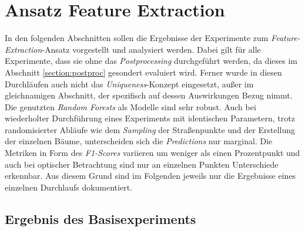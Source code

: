 \section{Ansatz Feature Extraction} 

In den folgenden Abschnitten sollen die Ergebnisse der Experimente zum \textit{Feature-Extraction}-Ansatz vorgestellt und analysiert werden. Dabei gilt für alle Experimente, dass sie ohne das \textit{Postprocessing} durchgeführt werden, da dieses im Abschnitt \ref{section:postproc} gesondert evaluiert wird. Ferner wurde in diesen Durchläufen auch nicht das \textit{Uniqueness}-Konzept eingesetzt, außer im gleichnamigen Abschnitt, der spezifisch auf dessen Auswirkungen Bezug nimmt.
Die genutzten \textit{Random Forests} als Modelle sind sehr robust. Auch bei wiederholter Durchführung eines Experiments mit identischen Parametern, trotz randomisierter Abläufe wie dem \textit{Sampling} der Straßenpunkte und der Erstellung der einzelnen Bäume, unterscheiden sich die \textit{Predictions} nur marginal. Die Metriken in Form des \textit{F1-Scores} variieren um weniger als einen Prozentpunkt und auch bei optischer Betrachtung sind nur an einzelnen Punkten Unterschiede erkennbar. Aus diesem Grund sind im Folgenden jeweils nur die Ergebnisse eines einzelnen Durchlaufs dokumentiert.

\subsection{Ergebnis des Basisexperiments}

